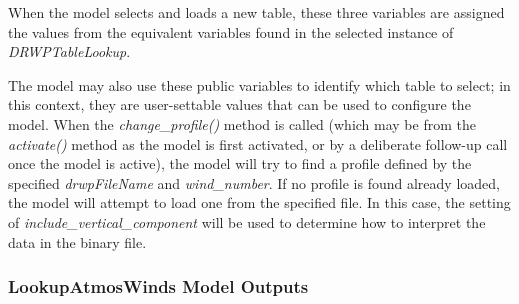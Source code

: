 \documentclass[11pt,fleqn]{report}
\begin{document}
When the model selects and loads a new table, these three variables are
assigned the values from the equivalent variables found in the selected
instance of \textit{DRWPTableLookup}.

The model may also use these public variables to identify which table to
select; in this context, they are user-settable values that can be used to
configure the model.  When the \textit{change\_profile()} method is called
(which may be from the \textit{activate()} method as the model is first
activated, or by a deliberate follow-up call once the model is active),
the model will try to find a profile defined by the
specified \textit{drwpFileName} and \textit{wind\_number}. If no profile is
found already loaded, the model will attempt to load one from the specified
file. In this case, the setting of \textit{include\_vertical\_component}
will be used to determine how to interpret the data in the binary file.


\subsubsection{LookupAtmosWinds Model Outputs}
\end{document}
